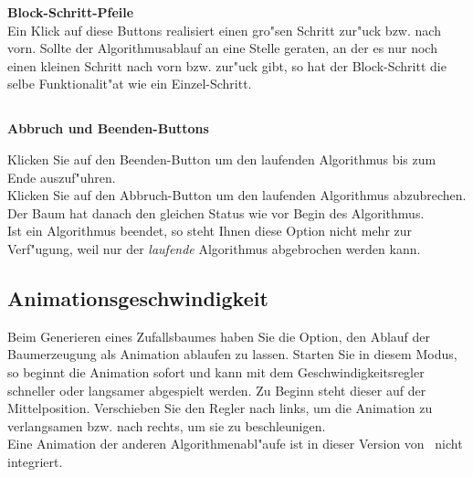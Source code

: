 \medskip
{} {\bf Block-Schritt-Pfeile} \\

Ein Klick auf diese Buttons realisiert einen gro"sen Schritt zur"uck bzw. nach vorn. Sollte der Algorithmusablauf an eine
Stelle geraten, an der es nur noch einen kleinen Schritt nach vorn bzw. zur"uck gibt, so hat der Block-Schritt die selbe
Funktionalit"at wie ein Einzel-Schritt. \\


\subsection[Abbruch und Beenden-Buttons]{}
\vspace{-4.3ex} {\bf {\large  \qquad \qquad \quad  Abbruch und Beenden-Buttons}} 



Klicken Sie auf den Beenden-Button  um den laufenden 
Algorithmus bis zum Ende auszuf"uhren. \\
Klicken Sie auf den Abbruch-Button  um den laufenden 
Algorithmus abzubrechen. Der Baum hat danach den gleichen Status wie vor Begin des Algorithmus. \\
Ist ein Algorithmus beendet, so steht Ihnen diese Option nicht mehr zur Verf"ugung, weil nur der
{\it laufende} Algorithmus abgebrochen werden kann. \\


\subsection{Animationsgeschwindigkeit}

Beim Generieren eines Zufallsbaumes haben Sie die Option, den Ablauf der Baumerzeugung als Animation ablaufen zu lassen.
Starten Sie in diesem Modus, so beginnt die Animation sofort und kann mit dem Geschwindigkeitsregler schneller oder langsamer abgespielt
werden. Zu Beginn steht dieser auf der Mittelposition. Verschieben Sie den Regler nach links, um die Animation zu verlangsamen
bzw. nach rechts, um sie zu beschleunigen. \\
Eine Animation der anderen Algorithmenabl"aufe ist in dieser Version von \AVL \ nicht integriert.

\bigskip
{}

\bigskip
\bigskip